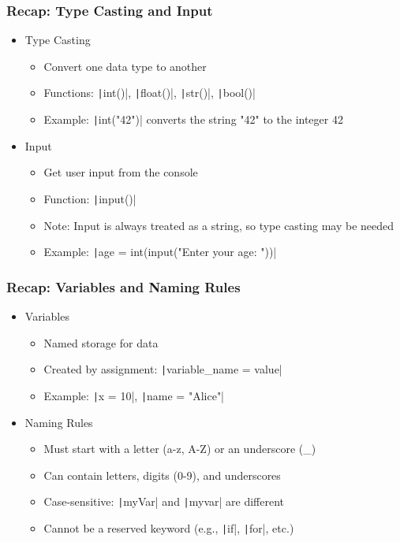 \documentclass{beamer}
\newcommand{\python}[1]{\texttt|#1|}
\begin{document}
\begin{frame}
    \frametitle{Recap: Type Casting and Input}
    \begin{itemize}
        \item Type Casting
              \begin{itemize}
                  \item Convert one data type to another
                  \item Functions: \python{int()}, \python{float()}, \python{str()}, \python{bool()}
                  \item Example: \python{int("42")} converts the string "42" to the integer 42
              \end{itemize}
        \item Input
              \begin{itemize}
                  \item Get user input from the console
                  \item Function: \python{input()}
                  \item Note: Input is always treated as a string, so type casting may be needed
                  \item Example: \python{age = int(input("Enter your age: "))}
              \end{itemize}
    \end{itemize}
\end{frame}
\begin{frame}
    \frametitle{Recap: Variables and Naming Rules}
    \begin{itemize}
        \item Variables
              \begin{itemize}
                  \item Named storage for data
                  \item Created by assignment: \python{variable_name = value}
                  \item Example: \python{x = 10}, \python{name = "Alice"}
              \end{itemize}
        \item Naming Rules
              \begin{itemize}
                  \item Must start with a letter (a-z, A-Z) or an underscore (\_)
                  \item Can contain letters, digits (0-9), and underscores
                  \item Case-sensitive: \python{myVar} and \python{myvar} are different
                  \item Cannot be a reserved keyword (e.g., \python{if}, \python{for}, etc.)
              \end{itemize}
    \end{itemize}
\end{frame}
\end{document}
